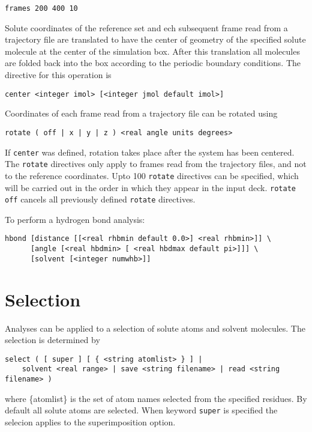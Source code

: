 \begin{verbatim}
frames 200 400 10
\end{verbatim}

Solute coordinates of the reference set and ech subsequent frame
read from a trajectory file are translated to have the center of
geometry of the specified solute molecule at the center of the
simulation box. After this translation all molecules are folded
back into the box according to the periodic boundary conditions.
The directive for this operation is

\begin{verbatim}
center <integer imol> [<integer jmol default imol>]
\end{verbatim}

Coordinates of each frame read from a trajectory file can be 
rotated using

\begin{verbatim}
rotate ( off | x | y | z ) <real angle units degrees>
\end{verbatim}

If \verb+center+ was defined, rotation takes place after
the system has been centered. The \verb+rotate+ directives
only apply to frames read from the trajectory files, and not
to the reference coordinates. Upto 100 \verb+rotate+ directives
can be specified, which will be carried out in the order in which
they appear in the input deck. \verb+rotate off+ cancels all
previously defined \verb+rotate+ directives.

To perform a hydrogen bond analysis:

\begin{verbatim}
hbond [distance [[<real rhbmin default 0.0>] <real rhbmin>]] \
      [angle [<real hbdmin> [ <real hbdmax default pi>]]] \
      [solvent [<integer numwhb>]]
\end{verbatim}

\section{Selection}

Analyses can be applied to a selection of solute atoms and solvent molecules. 
The selection is determined by

\begin{verbatim}
select ( [ super ] [ { <string atomlist> } ] |
	solvent <real range> | save <string filename> | read <string filename> )
\end{verbatim}

where {\rm \{atomlist\}} is the set of atom names selected from the specified residues. 
By default all solute atoms are selected. When keyword \verb+super+ is specified the selecion
applies to the superimposition option.

